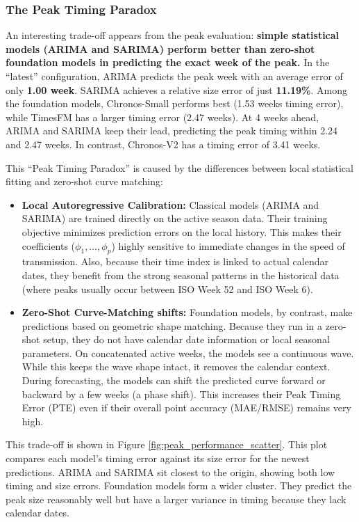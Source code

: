 \subsubsection{The Peak Timing Paradox}
An interesting trade-off appears from the peak evaluation: \textbf{simple statistical models (ARIMA and SARIMA) perform better than zero-shot foundation models in predicting the exact week of the peak.} In the ``latest'' configuration, ARIMA predicts the peak week with an average error of only \textbf{1.00 week}. SARIMA achieves a relative size error of just \textbf{11.19\%}. Among the foundation models, Chronos-Small performs best (1.53 weeks timing error), while TimesFM has a larger timing error (2.47 weeks). At 4 weeks ahead, ARIMA and SARIMA keep their lead, predicting the peak timing within 2.24 and 2.47 weeks. In contrast, Chronos-V2 has a timing error of 3.41 weeks.

This ``Peak Timing Paradox'' is caused by the differences between local statistical fitting and zero-shot curve matching:
\begin{itemize}
    \item \textbf{Local Autoregressive Calibration:} Classical models (ARIMA and SARIMA) are trained directly on the active season data. Their training objective minimizes prediction errors on the local history. This makes their coefficients ($\phi_1, \dots, \phi_p$) highly sensitive to immediate changes in the speed of transmission. Also, because their time index is linked to actual calendar dates, they benefit from the strong seasonal patterns in the historical data (where peaks usually occur between ISO Week 52 and ISO Week 6).
    \item \textbf{Zero-Shot Curve-Matching shifts:} Foundation models, by contrast, make predictions based on geometric shape matching. Because they run in a zero-shot setup, they do not have calendar date information or local seasonal parameters. On concatenated active weeks, the models see a continuous wave. While this keeps the wave shape intact, it removes the calendar context. During forecasting, the models can shift the predicted curve forward or backward by a few weeks (a phase shift). This increases their Peak Timing Error (PTE) even if their overall point accuracy (MAE/RMSE) remains very high.
\end{itemize}

This trade-off is shown in Figure \ref{fig:peak_performance_scatter}. This plot compares each model's timing error against its size error for the newest predictions. ARIMA and SARIMA sit closest to the origin, showing both low timing and size errors. Foundation models form a wider cluster. They predict the peak size reasonably well but have a larger variance in timing because they lack calendar dates.

